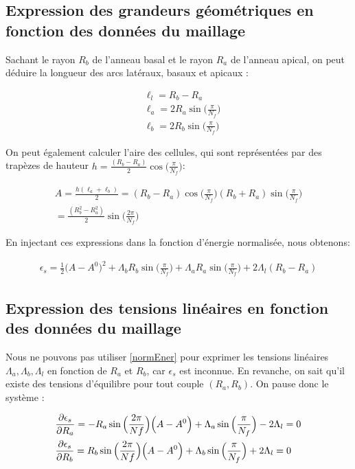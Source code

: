 \documentclass[11pt,a4paper]{article}
\begin{document}
\subsection{Expression des grandeurs géométriques en fonction des données du maillage}

Sachant le rayon $R_b$ de l'anneau basal et le rayon $R_a$ de l'anneau apical, on peut déduire la longueur des arcs latéraux, basaux et apicaux :

\begin{align*}
    &\ell_l = R_b - R_a \\
    &\ell_a = 2R_a\sin\Big(\frac{\pi}{N_f}\Big) \\
    &\ell_b = 2R_b\sin\Big(\frac{\pi}{N_f}\Big) 
\end{align*}

On peut également calculer l'aire des cellules, qui sont représentées par des trapèzes de hauteur $h = \frac{(R_b-R_a)}{2}\cos\Big(\frac{\pi}{N_f}\Big)$:

\begin{align*}
    A = \frac{h(\ell_a + \ell_b)}{2} = (R_b - R_a)\cos\Big(\frac{\pi}{N_f}\Big)(R_b + R_a)\sin\Big(\frac{\pi}{N_f}\Big) \\
    = \frac{(R_b^2 - R_a^2)}{2}\sin\Big(\frac{2\pi}{N_f}\Big)
\end{align*}


En injectant ces expressions dans la fonction d'énergie normalisée, nous obtenons:

\begin{align}\label{normEner}
    \epsilon_s =\frac{1}{2}\Big(A - A^0\Big)^2 + \Lambda_b R_b\sin\Big(\frac{\pi}{N_f}\Big) + \Lambda_a R_a\sin\Big(\frac{\pi}{N_f}\Big) + 2\Lambda_l(R_b - R_a)
\end{align}

\subsection{Expression des tensions linéaires en fonction des données du maillage}

Nous ne pouvons pas utiliser \eqref{normEner} pour exprimer les tensions linéaires $\Lambda_a, \Lambda_b, \Lambda_l$ en fonction de $R_a$ et $R_b$, car $\epsilon_s$ est inconnue. En revanche, on sait qu'il existe des tensions d'équilibre pour tout couple $(R_a, R_b)$. On pause donc le système :

\begin{subequations}{\label{prepartial}}
    \begin{align}
            &\frac{\partial \epsilon_s}{\partial R_a} = -R_a\sin\Big(\frac{2\pi}{Nf}\Big)\Big(A - A^0\Big)+\Lambda_a
            \sin\Big(\frac{\pi}{N_f}\Big)-2\Lambda_l = 0\label{prepartialA}\\
            &\frac{\partial \epsilon_s}{\partial R_b} = R_b\sin\Big(\frac{2\pi}{Nf}\Big)\Big(A - A^0\Big)+\Lambda_b \sin\Big(\frac{\pi}{N_f}\Big)+2\Lambda_l = 0\label{prepartialB}
    \end{align}
\end{subequations}
\end{document}

